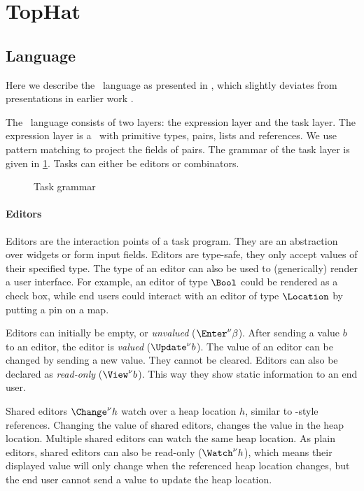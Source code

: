 
\section{TopHat}
\label{sec:tophat}

\subsection{Language}

Here we describe the \TOPHAT\ language as presented in \citet{Steenvoorden22},
which slightly deviates from presentations in earlier work \cite{conf/ppdp/SteenvoordenNK19,conf/ifl/NausSK19,conf/sfp/NausS20}.

The \TOPHAT\ language consists of two layers: the expression layer and the task layer.
The expression layer is a \STLC\ with primitive types, pairs, lists and references.
We use pattern matching to project the fields of pairs.
%
The grammar of the task layer is given in \cref{fig:task-grammar}.
Tasks can either be editors or combinators.

\begin{figure}
  \caption{Task grammar}
  \label{fig:task-grammar}
\end{figure}

\paragraph{Editors}

Editors are the interaction points of a task program.
They are an abstraction over widgets or form input fields.
Editors are type-safe,
they only accept values of their specified type.
The type of an editor can also be used to (generically) render a user interface.
For example,
an editor of type $\Bool$ could be rendered as a check box,
while end users could interact with an editor of type $\Location$ by putting a pin on a map.

Editors can initially be empty, or \emph{unvalued} ($\Enter^\nu \beta$).
After sending a value $b$ to an editor, the editor is \emph{valued} ($\Update^\nu b$).
The value of an editor can be changed by sending a new value.
They cannot be cleared.
Editors can also be declared as \emph{read-only} ($\View^\nu b$).
This way they show static information to an end user.

Shared editors $\Change^\nu h$ watch over a heap location $h$,
similar to \ML-style references.
Changing the value of shared editors,
changes the value in the heap location.
Multiple shared editors can watch the same heap location.
As plain editors, shared editors can also be read-only ($\Watch^\nu h$),
which means their displayed value will only change when the referenced heap location changes,
but the end user cannot send a value to update the heap location.

